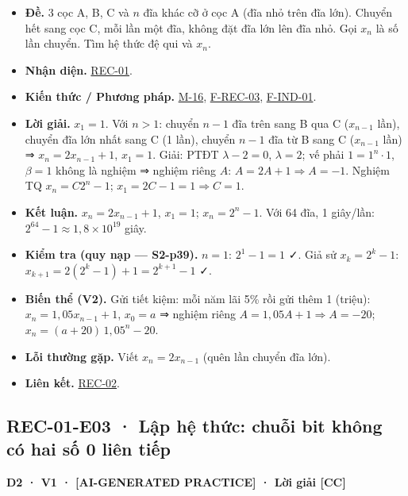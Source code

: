 \documentclass[
  10pt,
  twoside,openany]{book}
\providecommand{\tightlist}{%
  \setlength{\itemsep}{0pt}\setlength{\parskip}{0pt}}
\begin{document}
\begin{itemize}
\tightlist
\item
  \textbf{Đề.} 3 cọc A, B, C và \(n\) đĩa khác cỡ ở cọc A (đĩa nhỏ trên
  đĩa lớn). Chuyển hết sang cọc C, mỗi lần một đĩa, không đặt đĩa lớn
  lên đĩa nhỏ. Gọi \(x_n\) là số lần chuyển. Tìm hệ thức đệ qui và
  \(x_n\).
\item
  \textbf{Nhận diện.} \protect\hyperlink{REC-01}{REC-01}.
\item
  \textbf{Kiến thức / Phương pháp.} \protect\hyperlink{M-16}{M-16},
  \protect\hyperlink{F-REC-03}{F-REC-03},
  \protect\hyperlink{F-IND-01}{F-IND-01}.
\item
  \textbf{Lời giải.} \(x_1=1\). Với \(n>1\): chuyển \(n-1\) đĩa trên
  sang B qua C (\(x_{n-1}\) lần), chuyển đĩa lớn nhất sang C (1 lần),
  chuyển \(n-1\) đĩa từ B sang C (\(x_{n-1}\) lần) ⇒ \(x_n=2x_{n-1}+1\),
  \(x_1=1\). Giải: PTĐT \(\lambda-2=0\), \(\lambda=2\); vế phải
  \(1=1^n\cdot1\), \(\beta=1\) không là nghiệm ⇒ nghiệm riêng \(A\):
  \(A=2A+1\Rightarrow A=-1\). Nghiệm TQ \(x_n=C2^n-1\);
  \(x_1=2C-1=1\Rightarrow C=1\).
\item
  \textbf{Kết luận.} \(x_n=2x_{n-1}+1\), \(x_1=1\); \(x_n=2^n-1\). Với
  64 đĩa, 1 giây/lần: \(2^{64}-1\approx1{,}8\times10^{19}\) giây.
\item
  \textbf{Kiểm tra (quy nạp --- S2-p39).} \(n=1\): \(2^1-1=1\) ✓. Giả sử
  \(x_k=2^k-1\): \(x_{k+1}=2(2^k-1)+1=2^{k+1}-1\) ✓.
\item
  \textbf{Biến thể (V2).} Gửi tiết kiệm: mỗi năm lãi 5\% rồi gửi thêm 1
  (triệu): \(x_n=1{,}05x_{n-1}+1\), \(x_0=a\) ⇒ nghiệm riêng
  \(A=1{,}05A+1\Rightarrow A=-20\); \(x_n=(a+20)\,1{,}05^n-20\).
\item
  \textbf{Lỗi thường gặp.} Viết \(x_n=2x_{n-1}\) (quên lần chuyển đĩa
  lớn).
\item
  \textbf{Liên kết.} \protect\hyperlink{REC-02}{REC-02}.
\end{itemize}

\hypertarget{REC-01-E03}{%
\subsection{REC-01-E03 · Lập hệ thức: chuỗi bit không có hai số 0 liên
tiếp}\label{REC-01-E03}}

\textbf{D2 · V1 · {[}AI-GENERATED PRACTICE{]} · Lời giải {[}CC{]}}
\end{document}
